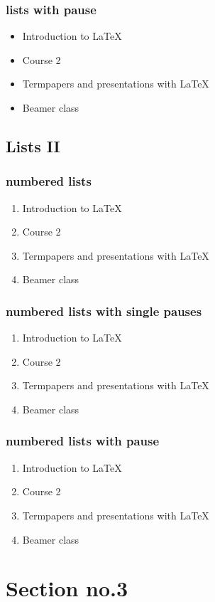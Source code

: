 \documentclass[hyperref]{beamer}
\begin{document}
\begin{frame}\frametitle{lists with pause}
\begin{itemize}[<+->]
\item Introduction to  \LaTeX{}  
\item Course 2
\item Termpapers and presentations with \LaTeX{}  
\item Beamer class
\end{itemize} 
\end{frame}

\subsection{Lists II}
\begin{frame}\frametitle{numbered lists}
\begin{enumerate}
\item Introduction to  \LaTeX{}   
\item Course 2 
\item Termpapers and presentations with \LaTeX{}  
\item Beamer class
\end{enumerate}
\end{frame}

\begin{frame}
\frametitle{numbered lists with single pauses}
\begin{enumerate}
\item Introduction to  \LaTeX{}  \pause 
\item Course 2 \pause 
\item Termpapers and presentations with \LaTeX{}  \pause 
\item Beamer class
\end{enumerate}
\end{frame}

\begin{frame}
\frametitle{numbered lists with pause}
\begin{enumerate}[<+->]
\item Introduction to  \LaTeX{}  
\item Course 2
\item Termpapers and presentations with \LaTeX{}  
\item Beamer class
\end{enumerate}
\end{frame}

\section{Section no.3} 
\end{document}
